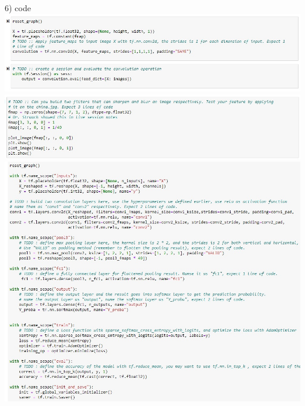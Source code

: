 \documentclass[11pt]{article}
\begin{document}
6) code \\
\includegraphics[scale=0.55]{code1} \\
\includegraphics[scale=0.55]{code2} \\
\includegraphics[scale=0.55]{code3} \\
\end{document}
